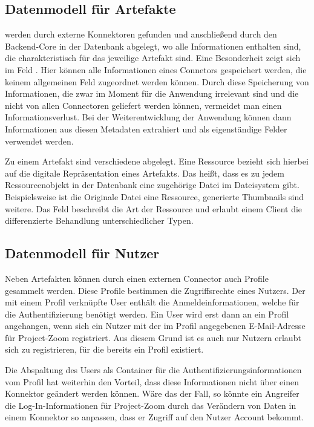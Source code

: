 \subsection{Datenmodell für Artefakte}

 werden durch externe Konnektoren gefunden und anschließend durch den Backend-Core in der Datenbank abgelegt, wo alle Informationen enthalten sind, die charakteristisch für das jeweilige Artefakt sind. Eine Besonderheit zeigt sich im Feld . Hier können alle Informationen eines Connetors gespeichert werden, die keinem allgemeinen Feld zugeordnet werden können. Durch diese Speicherung von Informationen, die zwar im Moment für die Anwendung irrelevant sind und die nicht von allen Connectoren geliefert werden können, vermeidet man einen Informationsverlust. Bei der Weiterentwicklung der Anwendung können dann Informationen aus diesen Metadaten extrahiert und als eigenständige Felder verwendet werden. 

Zu einem Artefakt sind verschiedene  abgelegt. Eine Ressource bezieht sich hierbei auf die digitale Repräsentation eines Artefakts. Das heißt, dass es zu jedem Ressourcenobjekt in der Datenbank eine zugehörige Datei im Dateisystem gibt. Beispielsweise ist die Originale Datei eine Ressource, generierte Thumbnails sind weitere. Das Feld  beschreibt die Art der Ressource und erlaubt einem Client die differenzierte Behandlung unterschiedlicher Typen.  

\subsection{Datenmodell für Nutzer}

Neben Artefakten können durch einen externen Connector auch Profile gesammelt werden. Diese Profile bestimmen die Zugriffsrechte eines Nutzers. Der mit einem Profil verknüpfte User enthält die Anmeldeinformationen, welche für die Authentifizierung benötigt werden. Ein User wird erst dann an ein Profil angehangen, wenn sich ein Nutzer mit der im Profil angegebenen E-Mail-Adresse für Project-Zoom registriert. Aus diesem Grund ist es auch nur Nutzern erlaubt sich zu registrieren, für die bereits ein Profil existiert.

Die Abspaltung des Users als Container für die Authentifizierungsinformationen vom Profil hat weiterhin den Vorteil, dass diese Informationen nicht über einen Konnektor geändert werden können. Wäre das der Fall, so könnte ein Angreifer die Log-In-Informationen für Project-Zoom durch das Verändern von Daten in einem Konnektor so anpassen, dass er Zugriff auf den Nutzer Account bekommt.

